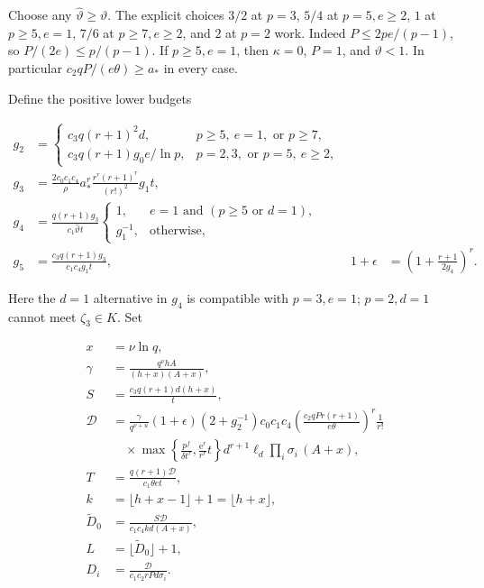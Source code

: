 \documentclass[
  11pt,
  a4paper,
]{article}
\begin{document}
Choose any \(\widehat\vartheta\ge\vartheta\). The explicit choices
\(3/2\) at \(p=3\), \(5/4\) at \(p=5,e\ge2\), \(1\) at \(p\ge5,e=1\),
\(7/6\) at \(p\ge7,e\ge2\), and \(2\) at \(p=2\) work. Indeed
\(P\le2pe/(p-1)\), so \(P/(2e)\le p/(p-1)\). If \(p\ge5,e=1\), then
\(\kappa=0\), \(P=1\), and \(\vartheta<1\). In particular
\(c_2qP/(e\theta)\ge a_*\) in every case.

Define the positive lower budgets

\[
\begin{aligned}
g_2&=\begin{cases}
c_3q(r+1)^2d,&p\ge5,\ e=1,\text{ or }p\ge7,\\
c_3q(r+1)g_0e/\ln p,&p=2,3,\text{ or }p=5,\ e\ge2,
\end{cases}\\
g_3&=\frac{2c_0c_1c_4}{\rho}
a_*^r\frac{r^r(r+1)^r}{(r!)^2}g_1t,\\
g_4&=\frac{q(r+1)g_3}{c_1\widehat\vartheta t}
\begin{cases}1,&e=1\text{ and }(p\ge5\text{ or }d=1),\\g_1^{-1},&\text{otherwise},\end{cases}\\
g_5&=\frac{c_3q(r+1)g_3}{c_1c_4g_1t},
&1+\epsilon&=\left(1+\frac{r+1}{2g_4}\right)^r.
\end{aligned}
\tag{10.185}
\]

Here the \(d=1\) alternative in \(g_4\) is compatible with \(p=3,e=1\);
\(p=2,d=1\) cannot meet \(\zeta_3\in K\). Set

\[
\begin{aligned}
x&=\nu\ln q,\\
\gamma&=\frac{q^\nu hA}{(h+x)(A+x)},\\
S&=\frac{c_3q(r+1)d(h+x)}t,\\
\mathcal D&=\frac{\gamma}{q^{\nu+u}}
(1+\epsilon)(2+g_2^{-1})c_0c_1c_4
\left(\frac{c_2qPr(r+1)}{e\theta}\right)^r\frac1{r!}\\
&\quad{}\times
\max\left\{\frac{p^f}{\delta t^r},\frac{\mathrm e^r}{r^r}t\right\}
d^{r+1}\ell_d\prod_i\sigma_i\,(A+x),\\
T&=\frac{q(r+1)\mathcal D}{c_1\theta et},\\
k&=\lfloor h+x-1\rfloor+1=\lfloor h+x\rfloor,\\
\widetilde D_0&=\frac{S\mathcal D}{c_1c_4kd(A+x)},\\
L&=\lfloor\widetilde D_0\rfloor+1,\\
D_i&=\frac{\mathcal D}{c_1c_2rPd\sigma_i}.
\end{aligned}
\tag{10.186}
\]
\end{document}

